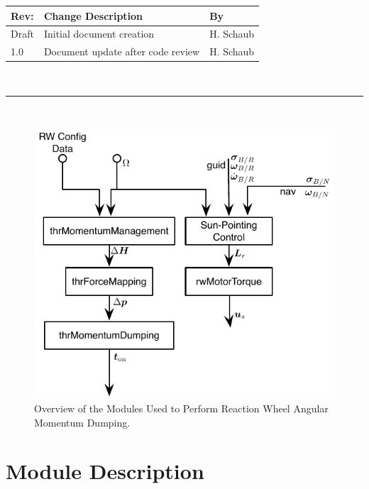 \documentclass[]{BasiliskReportMemo}
\begin{document}
\makeCover


%
%
\pagestyle{empty}
{\renewcommand{\arraystretch}{1.1}
\noindent
\begin{longtable}{|p{0.5in}|p{4.5in}|p{1.14in}|}
\hline
{\bfseries Rev}: & {\bfseries Change Description} & {\bfseries By} \\
\hline
Draft & Initial document creation & H. Schaub \\
1.0 & Document update after code review & H. Schaub \\
\hline

\end{longtable}
}

\newpage
\setcounter{page}{1}
\pagestyle{fancy}

\tableofcontents
~\\ \hrule ~\\

\begin{figure}[htb]
	\centerline{
	\includegraphics[]{Figures/rwMomentumOverview}
	}
	\caption{Overview of the Modules Used to Perform Reaction Wheel Angular Momentum Dumping.}
	\label{fig:Fig1}
\end{figure}

\section{Module Description}
\end{document}
